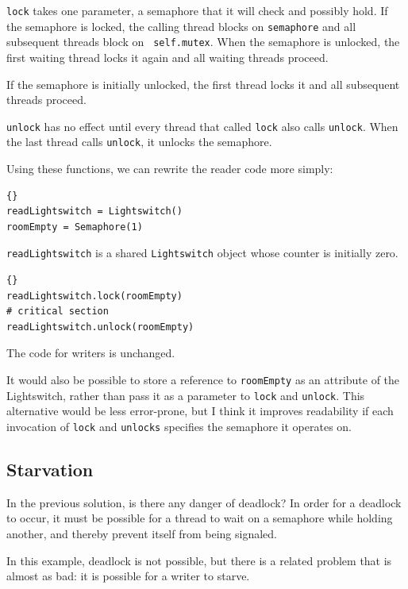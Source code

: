 \documentclass{book}
\begin{document}
{\tt lock} takes one parameter, a semaphore that it will check and
possibly hold.  If the semaphore is locked, the calling thread blocks
on {\tt semaphore} and all subsequent threads block on {\tt
self.mutex}.  When the semaphore is unlocked, the first waiting thread
locks it again and all waiting threads proceed.

If the semaphore is initially unlocked, the first thread locks it
and all subsequent threads proceed.

{\tt unlock} has no effect until every thread that called {\tt lock}
also calls {\tt unlock}.  When the last thread calls {\tt unlock}, it
unlocks the semaphore.

\newpage
Using these functions, we can rewrite the reader code
more simply:

\begin{lstlisting}[caption={Readers-writers initialization}]{}
readLightswitch = Lightswitch()
roomEmpty = Semaphore(1)
\end{lstlisting}

{\tt readLightswitch} is a shared {\tt Lightswitch} object whose counter
is initially zero.

\begin{lstlisting}[caption={Readers-writers solution (reader)}]{}
readLightswitch.lock(roomEmpty)
# critical section
readLightswitch.unlock(roomEmpty)
\end{lstlisting}

The code for writers is unchanged.

It would also be possible to store a reference to {\tt roomEmpty}
as an attribute of the Lightswitch, rather than pass it as a parameter
to {\tt lock} and {\tt unlock}.  This alternative would be less
error-prone, but I think it improves readability if each invocation
of {\tt lock} and {\tt unlocks} specifies the semaphore it operates on.

\subsection{Starvation}

In the previous solution, is there any danger of deadlock?
In order for a deadlock to occur, it must be possible for a
thread to wait on a semaphore while holding another, and thereby
prevent itself from being signaled.

In this example, deadlock is not possible, but there is a related
problem that is almost as bad: it is possible for a writer to
starve.
\end{document}
